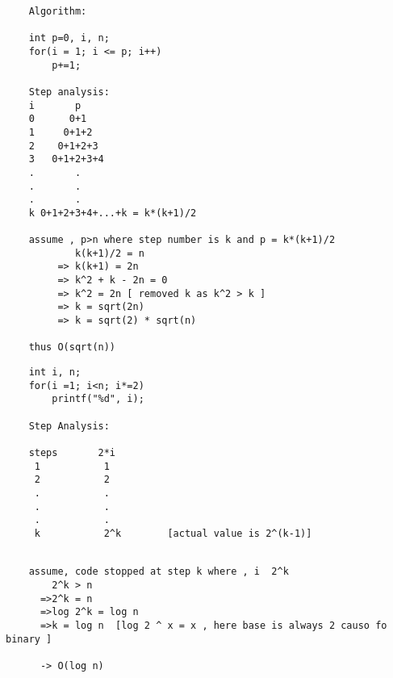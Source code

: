 \documentclass{article}
\begin{document}
\newpage
\hrulefill
\begin{verbatim}
    Algorithm:

    int p=0, i, n;
    for(i = 1; i <= p; i++)
        p+=1;

    Step analysis:
    i       p
    0      0+1
    1     0+1+2
    2    0+1+2+3
    3   0+1+2+3+4
    .       .
    .       .
    .       .
    k 0+1+2+3+4+...+k = k*(k+1)/2

    assume , p>n where step number is k and p = k*(k+1)/2
            k(k+1)/2 = n
         => k(k+1) = 2n
         => k^2 + k - 2n = 0
         => k^2 = 2n [ removed k as k^2 > k ]
         => k = sqrt(2n)
         => k = sqrt(2) * sqrt(n)

    thus O(sqrt(n))
\end{verbatim}
\hrulefill
\begin{verbatim}
    int i, n;
    for(i =1; i<n; i*=2)
        printf("%d", i);

    Step Analysis:
    
    steps       2*i
     1           1
     2           2
     .           .
     .           .
     .           .
     k           2^k        [actual value is 2^(k-1)]
     
\end{verbatim}
\newpage
\begin{verbatim}
    assume, code stopped at step k where , i  2^k
        2^k > n
      =>2^k = n
      =>log 2^k = log n
      =>k = log n  [log 2 ^ x = x , here base is always 2 causo fo binary ]

      -> O(log n)
\end{verbatim}
\end{document}
